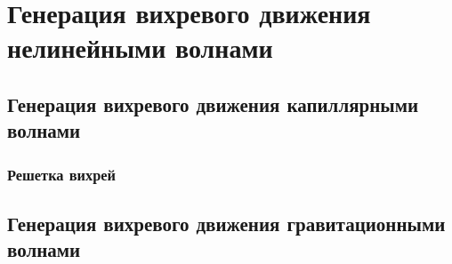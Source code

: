 \chapter{Генерация вихревого движения нелинейными волнами} \label{chapt4}

\section{Генерация вихревого движения капиллярными волнами} \label{sect4_1}
\subsection{Решетка вихрей} \label{sect4_1_1}
\section{Генерация вихревого движения гравитационными волнами} \label{sect4_2}

\clearpage